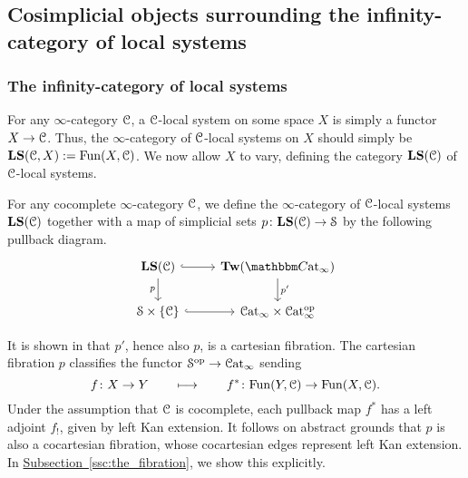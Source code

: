 \documentclass[main.tex]{subfiles}
\begin{document}
\subsection{Cosimplicial objects surrounding the infinity-category of local systems}
\label{ssc:the_infinity_category_of_local_systems}

\subsubsection{The infinity-category of local systems}
\label{sss:the_infinity_category_of_local_systems}

For any $\infty$-category $\mathcal{C}$, a $\mathcal{C}$-local system on some space $X$ is simply a functor $X \to \mathcal{C}$. Thus, the $\infty$-category of $\mathcal{C}$-local systems on $X$ should simply be $\mathbf{LS}(\mathcal{C}, X):=\mathrm{Fun}(X, \mathcal{C})$. We now allow $X$ to vary, defining the category $\mathbf{LS}(\mathcal{C})$ of $\mathcal{C}$-local systems.

\begin{definition}
  For any cocomplete $\infty$-category $\mathcal{C}$, we define the $\infty$-category of $\mathcal{C}$-local systems $\mathbf{LS}(\mathcal{C})$ together with a map of simplicial sets $p\colon \mathbf{LS}(\mathcal{C}) \to \mathcal{S}$ by the following pullback diagram.
  \begin{equation}
    \label{eq:pullback_square_defining_local_systems}
    \begin{tikzcd}
      \LS(\category{C})
      \arrow[r, hook]
      \arrow[d, swap, "p"]
      & \Tw(\ICCat)
      \arrow[d, "p'"]
      \\
      \S \times \{\category{C}\}
      \arrow[r, hook]
      & \ICat \times \ICat\op
    \end{tikzcd}
  \end{equation}
\end{definition}

It is shown in \cite{garcia2020enhanced} that $p'$, hence also $p$, is a cartesian fibration. The cartesian fibration $p$ classifies the functor $\mathcal{S}^{\mathrm{op}} \to \mathcal{C}\mathrm{at}_{\infty}$ sending
\begin{equation*}
  f\colon X \to Y \qquad \longmapsto \qquad f^{*}\colon \mathrm{Fun}(Y, \mathcal{C}) \to \mathrm{Fun}(X, \mathcal{C}).
\end{equation*}
Under the assumption that $\mathcal{C}$ is cocomplete, each pullback map $f^{*}$ has a left adjoint $f_{!}$, given by left Kan extension. It follows on abstract grounds that $p$ is also a cocartesian fibration, whose cocartesian edges represent left Kan extension. In \hyperref[ssc:the_fibration]{Subsection~\ref*{ssc:the_fibration}}, we show this explicitly.
\end{document}
